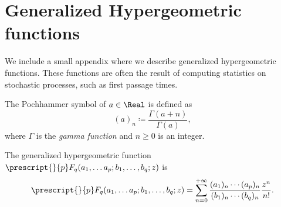 \section{Generalized Hypergeometric functions}
We include a small appendix where we describe generalized hypergeometric functions.
These functions are often the result of computing statistics on stochastic processes,
such as first passage times.

\begin{Definition}
  The Pochhammer symbol of \(a\in\Real\) is defined as 
  \[
    (a)_n \coloneqq \frac{\Gamma(a+n)}{\Gamma(a)},
  \]
  where \(\Gamma\) is the \emph{gamma function} and \(n\ge0\) is an integer.
\end{Definition}

\begin{Definition}
  The generalized hypergeometric function \(\prescript{}{p}F_q{\left(a_1,\dots a_p; b_1,\dots,b_q;z\right)}\) is
  \[
    \prescript{}{p}F_q{\left(a_1,\dots a_p; b_1,\dots,b_q;z\right)} =
    \sum_{n=0}^{+\infty} \frac{(a_1)_n\cdots(a_p)_n}{(b_1)_n\cdots(b_q)_n}\frac{z^n}{n!}.
  \]
\end{Definition}

